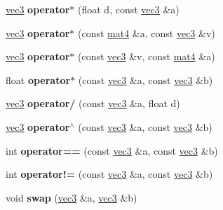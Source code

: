 \begin{DoxyCompactItemize}
\item 
\hypertarget{classvec3_a4f350a1d4850116faff5bd78cd2f1481}{\hyperlink{classvec3}{vec3} {\bfseries operator$\ast$} (float d, const \hyperlink{classvec3}{vec3} \&a)}\label{classvec3_a4f350a1d4850116faff5bd78cd2f1481}

\item 
\hypertarget{classvec3_a3a7a7dfc514a58f3c889b48fa4745815}{\hyperlink{classvec3}{vec3} {\bfseries operator$\ast$} (const \hyperlink{classmat4}{mat4} \&a, const \hyperlink{classvec3}{vec3} \&v)}\label{classvec3_a3a7a7dfc514a58f3c889b48fa4745815}

\item 
\hypertarget{classvec3_ac87402f559c51cd778b6012774481c39}{\hyperlink{classvec3}{vec3} {\bfseries operator$\ast$} (const \hyperlink{classvec3}{vec3} \&v, const \hyperlink{classmat4}{mat4} \&a)}\label{classvec3_ac87402f559c51cd778b6012774481c39}

\item 
\hypertarget{classvec3_ab5bbf53ffd2462f75a052197fc16589b}{float {\bfseries operator$\ast$} (const \hyperlink{classvec3}{vec3} \&a, const \hyperlink{classvec3}{vec3} \&b)}\label{classvec3_ab5bbf53ffd2462f75a052197fc16589b}

\item 
\hypertarget{classvec3_accb8e029b288a1703b8082b69af9f57f}{\hyperlink{classvec3}{vec3} {\bfseries operator/} (const \hyperlink{classvec3}{vec3} \&a, float d)}\label{classvec3_accb8e029b288a1703b8082b69af9f57f}

\item 
\hypertarget{classvec3_a16406bbc4fe292058a2a72c632bd9f04}{\hyperlink{classvec3}{vec3} {\bfseries operator$^\wedge$} (const \hyperlink{classvec3}{vec3} \&a, const \hyperlink{classvec3}{vec3} \&b)}\label{classvec3_a16406bbc4fe292058a2a72c632bd9f04}

\item 
\hypertarget{classvec3_afd81ebd50d23e1a4fb4b424757e96686}{int {\bfseries operator==} (const \hyperlink{classvec3}{vec3} \&a, const \hyperlink{classvec3}{vec3} \&b)}\label{classvec3_afd81ebd50d23e1a4fb4b424757e96686}

\item 
\hypertarget{classvec3_a381a6582f6b2009279a581249b5a88cd}{int {\bfseries operator!=} (const \hyperlink{classvec3}{vec3} \&a, const \hyperlink{classvec3}{vec3} \&b)}\label{classvec3_a381a6582f6b2009279a581249b5a88cd}

\item 
\hypertarget{classvec3_a38e0e5495e938b737df81f5b46748fc6}{void {\bfseries swap} (\hyperlink{classvec3}{vec3} \&a, \hyperlink{classvec3}{vec3} \&b)}\label{classvec3_a38e0e5495e938b737df81f5b46748fc6}


\end{DoxyCompactItemize}
